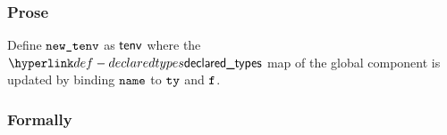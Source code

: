 \subsubsection{Prose}
Define $\newtenv$ as $\tenv$ where the $\declaredtypes$ map of the global component is updated
by binding $\name$ to $\tty$ and $\vf$.

\subsubsection{Formally}
\begin{mathpar}
\end{mathpar}
